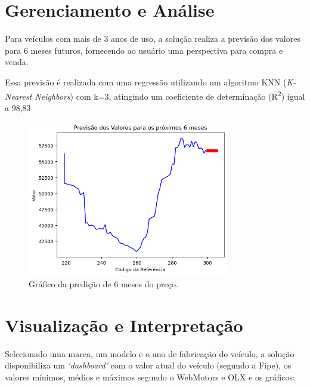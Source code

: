 \documentclass[conference]{IEEEtran}
\begin{document}
\section{Gerenciamento e Análise}

Para veículos com mais de 3 anos de uso, a solução realiza a previsão dos valores para 6 meses futuros, fornecendo ao usuário uma perspectiva para compra e venda.

Essa previsão é realizada com uma regressão utilizando um algoritmo KNN (\textit{K-Nearest Neighbors}) com k=3, atingindo um coeficiente de determinação (R\textsuperscript{2}) igual a 98,83%


\begin{figure}[htbp]
	\centerline{\includegraphics[width=250pt]{assets/previsao.png}}
	\caption{Gráfico da predição de 6 meses do preço.}
	\label{fig2}
\end{figure}


\section{Visualização e Interpretação}

Selecionado uma marca, um modelo e o ano de fabricação do veículo, a solução disponibiliza um \textit{`dashboard'} com o valor atual do veículo (segundo a Fipe), os valores mínimos, médios e máximos segundo o WebMotors e OLX e os gráficos:
\end{document}
